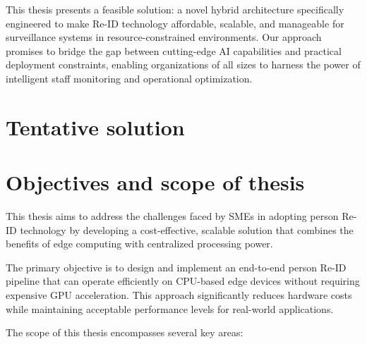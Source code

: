 \documentclass[../main.tex]{subfiles}
\begin{document}
This thesis presents a feasible solution: a novel hybrid architecture specifically engineered to make Re-ID technology affordable, scalable, and manageable for surveillance systems in resource-constrained environments. Our approach promises to bridge the gap between cutting-edge AI capabilities and practical deployment constraints, enabling organizations of all sizes to harness the power of intelligent staff monitoring and operational optimization.

\section{Tentative solution} 
\label{sec:tentative_solution}




\section{Objectives and scope of thesis} 
\label{sec:objectives}

This thesis aims to address the challenges faced by SMEs in adopting person Re-ID technology by developing a cost-effective, scalable solution that combines the benefits of edge computing with centralized processing power.

The primary objective is to design and implement an end-to-end person Re-ID pipeline that can operate efficiently on CPU-based edge devices without requiring expensive GPU acceleration. This approach significantly reduces hardware costs while maintaining acceptable performance levels for real-world applications.

The scope of this thesis encompasses several key areas:
\end{document}
